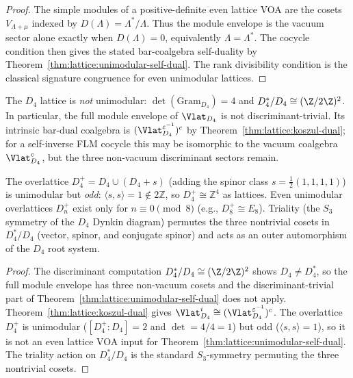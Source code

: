 \begin{proof}
The simple modules of a positive-definite even lattice VOA are the
cosets $V_{\Lambda+\mu}$ indexed by
$D(\Lambda)=\Lambda^*/\Lambda$. Thus the module envelope is the
vacuum sector alone exactly when $D(\Lambda)=0$, equivalently
$\Lambda=\Lambda^*$. The cocycle condition then gives the stated
bar-coalgebra self-duality by
Theorem~\ref{thm:lattice:unimodular-self-dual}. The rank divisibility
condition is the classical signature congruence for even unimodular
lattices.
\end{proof}

\begin{proposition}\label{prop:lattice:D4-triality}
The $D_4$ lattice is \emph{not} unimodular:
$\det(\mathrm{Gram}_{D_4}) = 4$ and $D_4^*/D_4 \cong
(\Z/2\Z)^2$.
In particular, the full module envelope of $\Vlat_{D_4}$ is not
discriminant-trivial. Its intrinsic bar-dual coalgebra is
$(\Vlat_{D_4}^{\varepsilon^{-1}})^c$
by Theorem~\ref{thm:lattice:koszul-dual}; for a self-inverse FLM
cocycle this may be isomorphic to the vacuum coalgebra
$\Vlat_{D_4}^c$, but the three non-vacuum discriminant sectors remain.

The overlattice $D_4^+ = D_4 \cup (D_4 + s)$ (adding the
spinor class $s = \tfrac{1}{2}(1,1,1,1)$) is unimodular but
\emph{odd}: $\langle s, s\rangle = 1 \notin 2\mathbb{Z}$, so
$D_4^+ \cong \mathbb{Z}^4$ as lattices. Even unimodular
overlattices $D_n^+$ exist only for $n \equiv 0 \pmod{8}$
(e.g., $D_8^+ \cong E_8$). Triality (the $S_3$ symmetry of
the $D_4$ Dynkin diagram) permutes the three nontrivial cosets
in $D_4^*/D_4$ (vector, spinor, and conjugate
spinor) and acts as an outer automorphism of the $D_4$ root
system.
\end{proposition}

\begin{proof}
The discriminant computation $D_4^*/D_4 \cong (\Z/2\Z)^2$ shows
$D_4 \neq D_4^*$, so the full module envelope has three non-vacuum
cosets and the discriminant-trivial part of
Theorem~\ref{thm:lattice:unimodular-self-dual} does not apply.
Theorem~\ref{thm:lattice:koszul-dual} gives
$\Vlat_{D_4}^i \cong (\Vlat_{D_4}^{\varepsilon^{-1}})^c$.
The overlattice $D_4^+$ is unimodular
($[D_4^+ : D_4] = 2$ and $\det = 4/4 = 1$) but odd
($\langle s, s\rangle = 1$), so it is not an even lattice VOA input
for Theorem~\ref{thm:lattice:unimodular-self-dual}. The triality
action on $D_4^*/D_4$ is the standard $S_3$-symmetry permuting the
three nontrivial cosets.
\end{proof}

